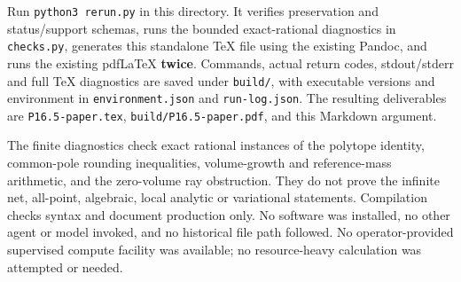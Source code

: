 \documentclass[
  10pt,
]{article}
\begin{document}
Run \texttt{python3\ rerun.py} in this directory. It verifies
preservation and status/support schemas, runs the bounded exact-rational
diagnostics in \texttt{checks.py}, generates this standalone TeX file
using the existing Pandoc, and runs the existing pdfLaTeX
\textbf{twice}. Commands, actual return codes, stdout/stderr and full
TeX diagnostics are saved under \texttt{build/}, with executable
versions and environment in \texttt{environment.json} and
\texttt{run-log.json}. The resulting deliverables are
\texttt{P16.5-paper.tex}, \texttt{build/P16.5-paper.pdf}, and this
Markdown argument.

The finite diagnostics check exact rational instances of the polytope
identity, common-pole rounding inequalities, volume-growth and
reference-mass arithmetic, and the zero-volume ray obstruction. They do
not prove the infinite net, all-point, algebraic, local analytic or
variational statements. Compilation checks syntax and document
production only. No software was installed, no other agent or model
invoked, and no historical file path followed. No operator-provided
supervised compute facility was available; no resource-heavy calculation
was attempted or needed.
\end{document}
